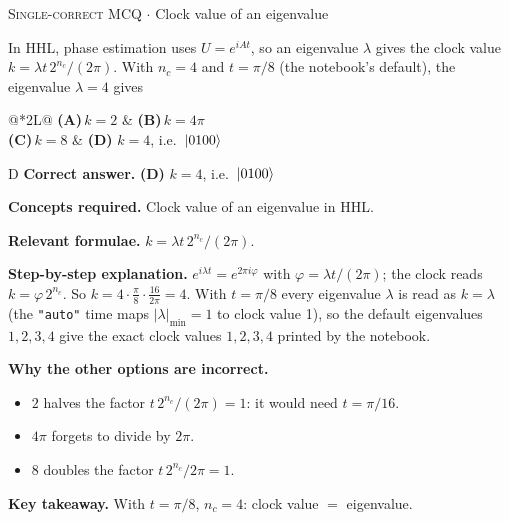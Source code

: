 \documentclass[11pt,a4paper]{article}
\newcommand{\optlabel}[1]{\textbf{(#1)}}
\newcommand{\correctlabel}[1]{\textcolor{okgreen}{\textbf{(#1)}\,\ding{51}}}
\newenvironment{qitem}[1]{\begin{list}{}{\setlength{\leftmargin}{3.3em}\setlength{\labelwidth}{3.1em}%
  \setlength{\labelsep}{0.2em}\setlength{\topsep}{3pt}\setlength{\parsep}{3pt}}\item[\textbf{Q.#1}\hfill]}{\end{list}}
\newcommand{\qsep}{\par\vspace{2pt}{\color{black!15}\hrule}\vspace{4pt}}
\newcommand{\qmeta}[2]{{\footnotesize\color{black!60}\textsc{#1} \;$\cdot$\; #2}\par}
\begin{document}
\begin{qitem}{22}
\qmeta{Single-correct MCQ}{Clock value of an eigenvalue}
In HHL, phase estimation uses $U = e^{iAt}$, so an eigenvalue $\lambda$ gives the clock value $k = \lambda t\,2^{n_c}/(2\pi)$. With $n_c = 4$ and $t = \pi/8$ (the notebook's
default), the eigenvalue $\lambda = 4$ gives
\par\smallskip\noindent\begin{tabularx}{\linewidth}{@{}*{2}{L}@{}}
\optlabel{A}\,$k = 2$ & \optlabel{B}\,$k = 4\pi$ \\[3pt]
\optlabel{C}\,$k = 8$ & \correctlabel{D}\,$k = 4$, i.e.\ $\ket{0100}$
\end{tabularx}
\end{qitem}
\begin{solbox}{D}
\textbf{\color{brand}Correct answer.} \textcolor{okgreen}{\textbf{(D)}} $k = 4$, i.e.\ $\ket{0100}$

\textbf{\color{brand}Concepts required.} Clock value of an eigenvalue in HHL.

\textbf{\color{brand}Relevant formulae.} $k = \lambda t\,2^{n_c}/(2\pi)$.

\textbf{\color{brand}Step-by-step explanation.} $e^{i\lambda t} = e^{2\pi i\varphi}$ with $\varphi = \lambda t/(2\pi)$; the clock reads $k = \varphi\,2^{n_c}$. So $k = 4\cdot\frac{\pi}{8}\cdot\frac{16}{2\pi} = 4$. With $t = \pi/8$ every eigenvalue
$\lambda$ is read as $k = \lambda$ (the \texttt{"auto"} time maps $|\lambda|_{\min} = 1$ to clock value 1), so the default eigenvalues $1, 2, 3, 4$ give the exact clock values
$1, 2, 3, 4$ printed by the notebook.

\textbf{\color{brand}Why the other options are incorrect.}
\begin{itemize}[leftmargin=2.4em, itemsep=1pt, topsep=2pt]
\item[\textbf{(A)}] $2$ halves the factor $t\,2^{n_c}/(2\pi) = 1$: it would need $t = \pi/16$.
\item[\textbf{(B)}] $4\pi$ forgets to divide by $2\pi$.
\item[\textbf{(C)}] $8$ doubles the factor $t\,2^{n_c}/2\pi = 1$.
\end{itemize}
\textbf{\color{brand}Key takeaway.} With $t = \pi/8$, $n_c = 4$: clock value $=$ eigenvalue.
\end{solbox}
\qsep
\end{document}
